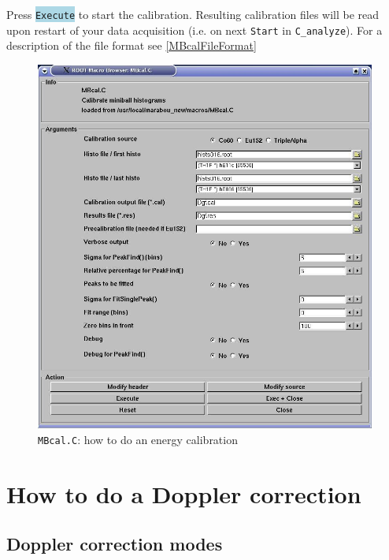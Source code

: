 \documentclass[10pt]{article}
\newcommand{\blue}[1]{\colorbox{lightblue}{\texttt{#1}}}
\begin{document}
Press \blue{Execute} to start the calibration.
Resulting calibration files will be read upon restart of your data acquisition (i.e. on next \texttt{Start} in \texttt{C\_analyze}).
For a description of the file format see \ref{MBcalFileFormat}
\newpage
\begin{figure}[H]
\centerline{\includegraphics[width=\linewidth]{MBcalForm}}
\caption{\texttt{MBcal.C}: how to do an energy calibration}
\label{MBcal}
\end{figure}
\newpage
\section{How to do a Doppler correction}\vspace{3mm}
\subsection{Doppler correction modes}\vspace{3mm}
\end{document}
